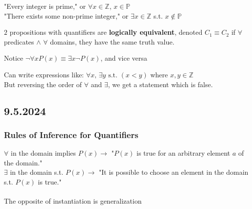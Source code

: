 \documentclass[11pt]{scrartcl}
\begin{document}
\begin{example}
    "Every integer is prime," or $\forall x \in \mathbb{Z}$, $x \in \mathbb{P}$\\
    "There exists some non-prime integer," or $\exists x\in \mathbb{Z}$ s.t. $x \notin \mathbb{P}$
\end{example}
\begin{definition}
    $2$ propositions with quantifiers are \textbf{logically equivalent}, denoted $C_1 \equiv C_2$ if $\forall$ predicates $\wedge$ $\forall$ domains, they have the same truth value. 
\end{definition}
\begin{remark}
    Notice $\neg \forall x P(x) \equiv \exists x \neg P(x)$, and vice versa
\end{remark}
\begin{example}
    Can write expressions like: $\forall x\text{, } \exists y\text{ s.t. }(x < y)$ where $x, y\in \mathbb{Z}$\\
    But reversing the order of $\forall$ and $\exists$, we get a statement which is false.
\end{example}
\Line
\subsection{9.5.2024}
\subsubsection{Rules of Inference for Quantifiers}
\begin{definition}[instantiation]
    $\forall$ in the domain implies $P(x)\rightarrow$ "$P(x)$ is true for an arbitrary element $a$ of the domain."\\
    $\exists$ in the domain s.t. $P(x)\rightarrow$ "It is possible to choose an element in the domain s.t. $P(x)$ is true."\\
    \\
    The opposite of instantiation is generalization 
\end{definition}
\end{document}
